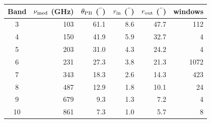 \begin{tabular}{@{}crrrrr@{}}
\toprule
Band & $\nu_{\rm med}$ (GHz) & $\theta_{\rm PB}$ ($^{\prime\prime}$) & $r_{\rm in}$ ($^{\prime\prime}$) & $r_{\rm out}$ ($^{\prime\prime}$) & windows \\
\midrule
3 & 103 & 61.1 & 8.6 & 47.7 & 112 \\
4 & 150 & 41.9 & 5.9 & 32.7 & 4 \\
5 & 203 & 31.0 & 4.3 & 24.2 & 4 \\
6 & 231 & 27.3 & 3.8 & 21.3 & 1072 \\
7 & 343 & 18.3 & 2.6 & 14.3 & 423 \\
8 & 487 & 12.9 & 1.8 & 10.1 & 24 \\
9 & 679 & 9.3 & 1.3 & 7.2 & 4 \\
10 & 861 & 7.3 & 1.0 & 5.7 & 8 \\
\bottomrule
\end{tabular}
